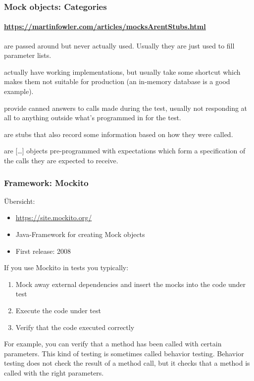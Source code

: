 
\begin{frame}
 \frametitle{Mock objects: Categories}
  \framesubtitle{\url{https://martinfowler.com/articles/mocksArentStubs.html}}
 
 \begin{description}
  \item[Dummy objects] are passed around but never actually used. Usually they are just used to fill parameter lists. \pause
  \item[Fake objects] actually have working implementations, but usually take some shortcut which makes them not suitable for production (an in-memory database is a good example). \pause
  \item[Stubs] provide canned answers to calls made during the test, usually not responding at all to anything outside what's programmed in for the test. \pause
  \item[Spies] are stubs that also record some information based on how they were called. \pause
  \item[Mocks] are [\dots] objects pre-programmed with expectations which form a specification of the calls they are expected to receive.
 \end{description}
\end{frame}


\begin{frame}
 \frametitle{Framework: Mockito}
 
Übersicht:
\begin{itemize}
	\item \url{https://site.mockito.org/}
   \item Java-Framework for creating Mock objects
   \item First release: 2008
\end{itemize}

If you use Mockito in tests you typically:
\begin{enumerate}
	\item Mock away external dependencies and insert the mocks into the code under test
	\item Execute the code under test
	\item Verify that the code executed correctly
\end{enumerate}
For example, you can verify that a method has been called with certain parameters. This kind of testing is sometimes called behavior testing. Behavior testing does not check the result of a method call, but it checks that a method is called with the right parameters.
\end{frame}

